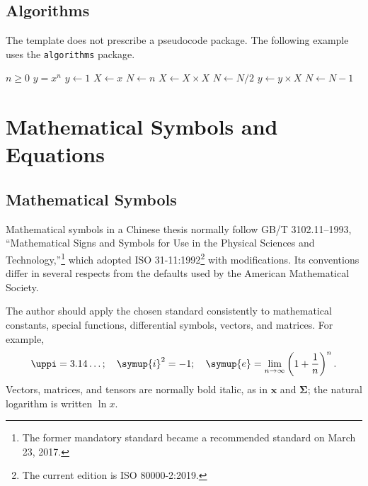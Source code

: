 \documentclass{thuthesis}
\begin{document}
\section{Algorithms}

The template does not prescribe a pseudocode package. The following example uses
the \texttt{algorithms} package.

\renewcommand{\algorithmicrequire}{\textbf{Input:}\unskip}
\renewcommand{\algorithmicensure}{\textbf{Output:}\unskip}
\begin{algorithm}
  \caption{Compute $y=x^n$}
  \small
  \begin{algorithmic}
    \REQUIRE $n \geq 0$
    \ENSURE $y=x^n$
    \STATE $y \leftarrow 1$
    \STATE $X \leftarrow x$
    \STATE $N \leftarrow n$
    \STATE $X \leftarrow X \times X$
    \STATE $N \leftarrow N/2$
    \ELSE
    \STATE $y \leftarrow y \times X$
    \STATE $N \leftarrow N-1$
    \ENDIF
    \ENDWHILE
  \end{algorithmic}
\end{algorithm}

\chapter{Mathematical Symbols and Equations}

\section{Mathematical Symbols}

Mathematical symbols in a Chinese thesis normally follow GB/T 3102.11--1993,
``Mathematical Signs and Symbols for Use in the Physical Sciences and
Technology,''\footnote{The former mandatory standard became a
recommended standard on March 23, 2017.}
which adopted ISO 31-11:1992\footnote{The current edition is ISO 80000-2:2019.}
with modifications. Its conventions differ in several respects from the
defaults used by the American Mathematical Society.

The author should apply the chosen standard consistently to mathematical
constants, special functions, differential symbols, vectors, and matrices. For
example,
\begin{equation*}
  \uppi=3.14\dots; \quad \symup{i}^2=-1; \quad
  \symup{e}=\lim_{n\to\infty}\left(1+\frac{1}{n}\right)^n.
\end{equation*}
Vectors, matrices, and tensors are normally bold italic, as in $\symbf{x}$ and
$\symbf{\Sigma}$; the natural logarithm is written $\ln x$.
\end{document}
